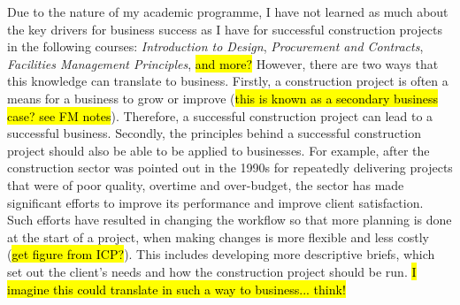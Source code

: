 Due to the nature of my academic programme, I have not learned as much about the key drivers for business success as I have for successful construction projects in the following courses:
\textit{Introduction to Design},
\textit{Procurement and Contracts},
\textit{Facilities Management Principles},
\hl{and more?}
However, there are two ways that this knowledge can translate to business.
Firstly, a construction project is often a means for a business to grow or improve (\hl{this is known as a secondary business case? see FM notes}).
Therefore, a successful construction project can lead to a successful business.
Secondly, the principles behind a successful construction project should also be able to be applied to businesses.
For example, after the construction sector was pointed out in the 1990s for repeatedly delivering projects that were of poor quality, overtime and over-budget, the sector has made significant efforts to improve its performance and improve client satisfaction.
Such efforts have resulted in changing the workflow so that more planning is done at the start of a project, when making changes is more flexible and less costly (\hl{get figure from ICP?}).
This includes developing more descriptive briefs, which set out the client's needs and how the construction project should be run.
\hl{I imagine this could translate in such a way to business... think!}


